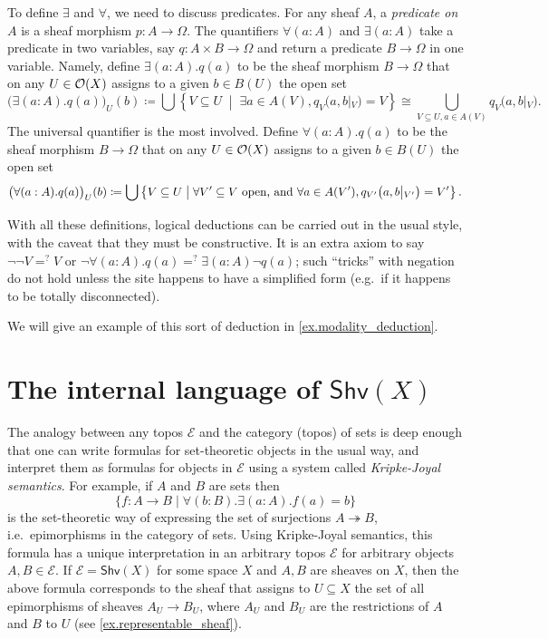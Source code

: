\documentclass[11pt, oneside, article]{memoir}
\theoremstyle{plain}
\theoremstyle{definition}
\theoremstyle{remark}
\renewcommand{\ss}{\subseteq}
\newcommand{\cat}[1]{\mathcal{#1}}
\newcommand{\Fun}[1]{\mathsf{#1}}
\newcommand{\surj}{\twoheadrightarrow}
\newcommand{\tn}[1]{\textnormal{#1}}
\newcommand{\shv}{\Fun{Shv}}
\newcommand{\Op}[1][undef]{\ifthenelse{\equal{#1}{undef}}{\mathcal{O}}{\mathcal{O}(#1)}}
\newcommand{\rest}[2]{#1\big|\hspace{0in}_{#2}}
\begin{document}
To define $\exists$ and $\forall$, we need to discuss predicates. For any sheaf $A$, a \emph{predicate on $A$} is a sheaf morphism $p\colon A\to\Omega$. The quantifiers $\forall(a:A)$ and $\exists(a:A)$ take a predicate in two variables, say $q\colon A\times B\to\Omega$ and return a predicate $B\to\Omega$ in one variable. Namely, define $\exists(a:A).q(a)$ to be the sheaf morphism $B\to\Omega$ that on any $U\in\Op[X]$ assigns to a given $b\in B(U)$ the open set
\[
\big(\exists(a:A).q(a)\big)_U(b)\coloneqq\bigcup\left\{V\ss U\;\middle|\;\exists a\in A(V), q_V\big(a,\rest{b}{V}\big)=V\right\}\cong\bigcup_{V\ss U,a\in A(V)}q_V\big(a,\rest{b}{V}\big).
\]
The universal quantifier is the most involved. Define $\forall(a:A).q(a)$ to be the sheaf morphism $B\to\Omega$ that on any $U\in\Op[X]$ assigns to a given $b\in B(U)$ the open set
\[
\big(\forall(a:A).q(a)\big)_U(b)\coloneqq\bigcup\left\{V\ss U\;\middle|\;
\forall V'\ss V \tn{ open, and } \forall a\in A(V'), q_{V'}\big(a,\rest{b}{V'}\big)=V'\right\}.
\]

With all these definitions, logical deductions can be carried out in the usual style, with the caveat that they must be constructive. It is an extra axiom to say $\neg\neg V=^?V$ or $\neg\forall (a:A).q(a) =^? \exists (a:A)\neg q(a)$; such ``tricks'' with negation do not hold unless the site happens to have a simplified form (e.g.\ if it happens to be totally disconnected).

We will give an example of this sort of deduction in \cref{ex.modality_deduction}.

\section{The internal language of $\shv(X)$}\label{sec.internal_language}

The analogy between any topos $\cat{E}$ and the category (topos) of sets is deep enough that one can write formulas for set-theoretic objects in the usual way, and interpret them as formulas for objects in $\cat{E}$ using a system called \emph{Kripke-Joyal semantics}. For example, if $A$ and $B$ are sets then 
\begin{equation}\label{eqn.epi}
\{f\colon A\to B\mid \forall (b:B).\exists(a:A). f(a)=b\}
\end{equation}
is the set-theoretic way of expressing the set of surjections $A\surj B$, i.e.\ epimorphisms in the category of sets. Using Kripke-Joyal semantics, this formula has a unique interpretation in an arbitrary topos $\cat{E}$ for arbitrary objects $A,B\in\cat{E}$. If $\cat{E}=\shv(X)$ for some space $X$ and $A,B$ are sheaves on $X$, then the above formula corresponds to the sheaf that assigns to $U\ss X$ the set of all epimorphisms of sheaves $A_U\to B_U$, where $A_U$ and $B_U$ are the restrictions of $A$ and $B$ to $U$ (see \cref{ex.representable_sheaf}).
\end{document}
